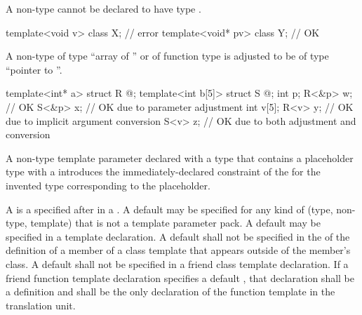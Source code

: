\pnum
\begin{note}
A non-type
cannot be declared to have type \cv{} .
\begin{example}
\begin{codeblock}
template<void v> class X;       // error
template<void* pv> class Y;     // OK
\end{codeblock}
\end{example}
\end{note}

\pnum
A non-type
%
of type ``array of '' or
%
of function type 
is adjusted to be of type ``pointer to ''.
\begin{example}
\begin{codeblock}
template<int* a>   struct R { @\commentellip@ };
template<int b[5]> struct S { @\commentellip@ };
int p;
R<&p> w;                        // OK
S<&p> x;                        // OK due to parameter adjustment
int v[5];
R<v> y;                         // OK due to implicit argument conversion
S<v> z;                         // OK due to both adjustment and conversion
\end{codeblock}
\end{example}

\pnum
A non-type template parameter declared with a type that
contains a placeholder type with a 
introduces the immediately-declared constraint
of the 
for the invented type corresponding to the placeholder.

\pnum
A
is a
 specified after
\tcode{=}
in a
.
A default
may be specified for any kind of
(type, non-type, template)
that is not a template parameter pack.
A default
may be specified in a template declaration.
A default
shall not be specified in the
of the definition of a member of a class template that appears outside
of the member's class.
A default
shall not be specified in a friend class template declaration.
If a friend function template declaration
specifies a default
,
that declaration shall be a definition and shall be the only declaration of
the function template in the translation unit.

